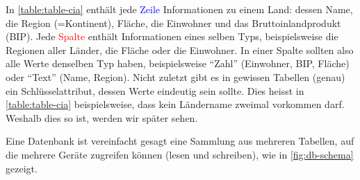 \begin{table}[H]
  \centering
  \tiny
  \caption{Typische Tabellenstruktur Anhand einer Tabelle mit Informationen zu Ländern}
  \label{table:table-cia}
\end{table}
In \cref{table:table-cia} enthält jede \textcolor{blue}{Zeile} Informationen zu einem Land: dessen Name, die Region (=Kontinent), Fläche, die Einwohner und das Bruttoinlandprodukt (BIP). Jede \textcolor{red}{Spalte} enthält Informationen eines selben Typs, beispielsweise die Regionen aller Länder, die Fläche oder die Einwohner. In einer Spalte sollten also alle Werte denselben Typ haben, beispielsweise ``Zahl'' (Einwohner, BIP, Fläche) oder ``Text'' (Name, Region). Nicht zuletzt gibt es in gewissen Tabellen (genau) ein Schlüsselattribut, dessen Werte eindeutig sein sollte. Dies heisst in \cref{table:table-cia} beispielsweise, dass kein Ländername zweimal vorkommen darf. Weshalb dies so ist, werden wir später sehen.

Eine Datenbank ist vereinfacht gesagt eine Sammlung aus mehreren Tabellen, auf die mehrere Geräte zugreifen können (lesen und schreiben), wie in \cref{fig:db-schema} gezeigt.



